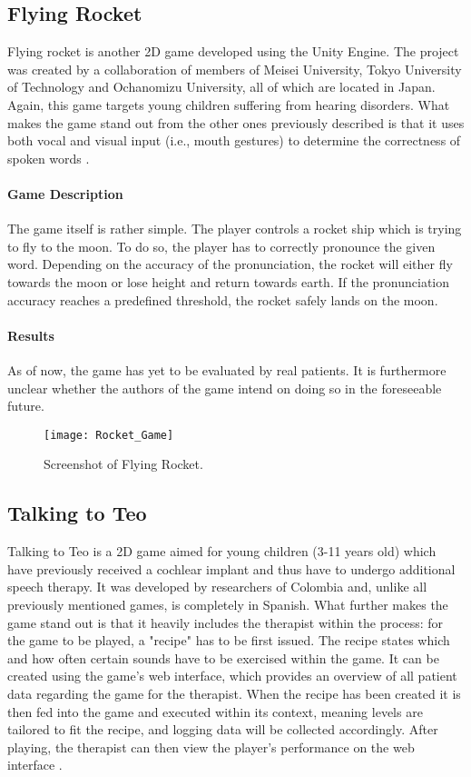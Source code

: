 \documentclass[draft,final]{vutinfth} %
\begin{document}
\subsection{Flying Rocket}
Flying rocket is another 2D game developed using the Unity Engine. The project was created by a collaboration of members of Meisei University, Tokyo University of Technology and Ochanomizu University, all of which are located in Japan. Again, this game targets young children suffering from hearing disorders. What makes the game stand out from the other ones previously described is that it uses both vocal and visual input (i.e., mouth gestures) to determine the correctness of spoken words \cite{takagi2020voice}. 

\paragraph{Game Description} 
The game itself is rather simple. The player controls a rocket ship which is trying to fly to the moon. To do so, the player has to correctly pronounce the given word. Depending on the accuracy of the pronunciation, the rocket will either fly towards the moon or lose height and return towards earth. If the pronunciation accuracy reaches a predefined threshold, the rocket safely lands on the moon.

\paragraph{Results} As of now, the game has yet to be evaluated by real patients. It is furthermore unclear whether the authors of the game intend on doing so in the foreseeable future.

\begin{figure}
\begin{center}
\texttt{[image: Rocket\_Game]}
\end{center}
\caption{Screenshot of Flying Rocket\cite{takagi2020voice}.}
\end{figure}


\subsection{Talking to Teo}
Talking to Teo is a 2D game aimed for young children (3-11 years old) which have previously received a cochlear implant and thus have to undergo additional speech therapy. It was developed by researchers of Colombia and, unlike all previously mentioned games, is completely in Spanish. What further makes the game stand out is that it heavily includes the therapist within the process: for the game to be played, a "recipe" has to be first issued. The recipe states which and how often certain sounds have to be exercised within the game. It can be created using the game's web interface, which provides an overview of all patient data regarding the game for the therapist. When the recipe has been created it is then fed into the game and executed within its context, meaning levels are tailored to fit the recipe, and logging data will be collected accordingly. After playing, the therapist can then view the player's performance on the web interface \cite{navarro2014talking}. 
\end{document}
